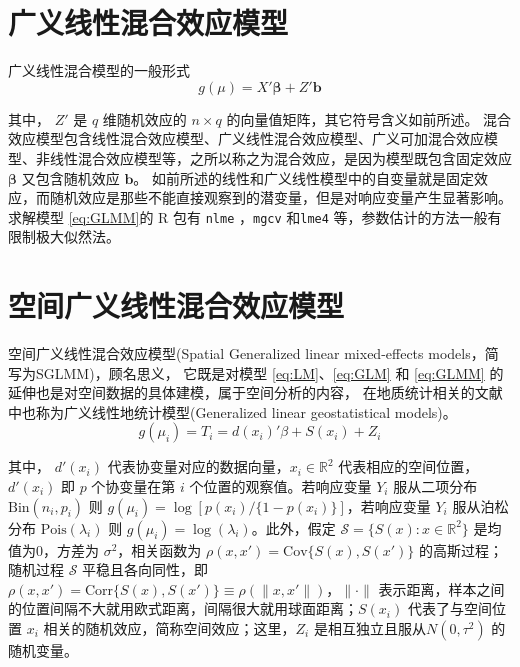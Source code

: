 \documentclass[hyperref, a4paper, UTF8, zihao = -4, linespread = 1.25, scheme = chinese]{ctexbook}
\begin{document}
\section{广义线性混合效应模型}

广义线性混合模型的一般形式\begin{equation}
g(\mu) = X'\boldsymbol{\beta} + Z'\mathbf{b}  \label{eq:GLMM}
\end{equation}

其中， \(Z'\) 是 \(q\) 维随机效应的 \(n \times q\)
的向量值矩阵，其它符号含义如前所述。
混合效应模型包含线性混合效应模型、广义线性混合效应模型、广义可加混合效应模型、非线性混合效应模型等，之所以称之为混合效应，是因为模型既包含固定效应
\(\boldsymbol{\beta}\) 又包含随机效应 \(\mathbf{b}\)。
如前所述的线性和广义线性模型中的自变量就是固定效应，而随机效应是那些不能直接观察到的潜变量，但是对响应变量产生显著影响。求解模型
\eqref{eq:GLMM}的 R 包有 \texttt{nlme} \citep{R-nlme}，\texttt{mgcv}
\citep{mgcv2017} 和\texttt{lme4}\citep{lme4JSS}
等，参数估计的方法一般有限制极大似然法。

\section{空间广义线性混合效应模型}

空间广义线性混合效应模型(Spatial Generalized linear mixed-effects
models，简写为SGLMM)，顾名思义， 它既是对模型 \eqref{eq:LM}、\eqref{eq:GLM}
和 \eqref{eq:GLMM} 的延伸也是对空间数据的具体建模，属于空间分析的内容，
在地质统计相关的文献中也称为广义线性地统计模型(Generalized linear
geostatistical models)\citep{Diggle2007}。\begin{equation}
g(\mu_i) = T_{i} = d(x_i)'\beta + S(x_i) + Z_i \label{eq:SGLMM}
\end{equation}

其中， \(d'(x_i)\) 代表协变量对应的数据向量，\(x_i \in \mathbb{R}^2\)
代表相应的空间位置，\(d'(x_i)\) 即 \(p\) 个协变量在第 \(i\)
个位置的观察值。若响应变量 \(Y_i\) 服从二项分布
\(\mathrm{Bin}(n_i,p_i)\) 则
\(g(\mu_i) = \log[p(x_i)/\{1-p(x_i)\}]\)，若响应变量 \(Y_i\)
服从泊松分布 \(\mathrm{Pois}(\lambda_i)\) 则
\(g(\mu_i) = \log(\lambda_i)\)。此外，假定
\(\mathcal{S} = \{S(x): x \in \mathbb{R}^2\}\) 是均值为0，方差为
\(\sigma^2\)，相关函数为 \(\rho(x,x') = \mathrm{Cov}\{S(x),S(x')\}\)
的高斯过程；随机过程 \(\mathcal{S}\) 平稳且各向同性，即
\(\rho(x,x') = \mathrm{Corr}\{S(x),S(x')\} \equiv \rho(\|x,x'\|)\)，\(\|\cdot\|\)
表示距离，样本之间的位置间隔不大就用欧式距离，间隔很大就用球面距离；\(S(x_i)\)
代表了与空间位置 \(x_i\) 相关的随机效应，简称空间效应；这里，\(Z_i\)
是相互独立且服从\(N(0,\tau^2)\) 的随机变量。
\end{document}

